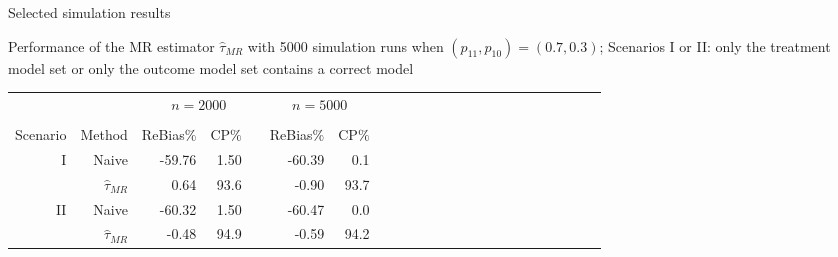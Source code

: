 \documentclass[12pt,aspectratio=169]{beamer}
\begin{document}
\begin{frame}{Selected simulation results}

{\small Performance of  the MR estimator $\hat\tau_{MR}$  with 5000 simulation runs when $(p_{11},p_{10})=(0.7,0.3)$; 
Scenarios I or II: only the treatment model set or only the outcome model set contains a correct model}

\begin{table}[t]
\begin{center}
\begin{tabular}{rrrrrrrrrrrrrrrrrrrrrrr}
\toprule
     && \multicolumn{3}{c}{$n=2000$} &\multicolumn{2}{c}{$n=5000$}\\
\cline{3-4}     \cline{6-7} \\
Scenario &Method  & ReBias$\%$    & CP$\%$&&  ReBias$\%$    & CP$\%$ \\\midrule
I&Naive&-59.76&1.50&&-60.39&0.1\\
\vspace{2mm}
\cellcolor{blueHL} &\cellcolor{blueHL}  $\hat\tau_{MR}$& \cellcolor{blueHL} 0.64& \cellcolor{blueHL} 93.6& \cellcolor{blueHL} & \cellcolor{blueHL} -0.90& \cellcolor{blueHL} 93.7&\cellcolor{blueHL}\\
II&Naive&-60.32&1.50&&-60.47&0.0\\
\vspace{2mm}
\cellcolor{blueHL} &\cellcolor{blueHL} $\hat\tau_{MR}$& \cellcolor{blueHL} -0.48& \cellcolor{blueHL} 94.9& \cellcolor{blueHL} & \cellcolor{blueHL} -0.59&\cellcolor{blueHL}  94.2&\cellcolor{blueHL}\\
\bottomrule
\end{tabular}

\end{center}
\end{table}

\end{frame}



  
\end{document}

